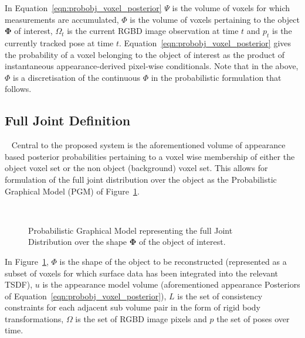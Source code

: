 In Equation~\ref{eqn:probobj_voxel_posterior} \( \Psi \) is the volume of 
voxels for which measurements are accumulated, \( \Phi \)  is the volume of voxels 
pertaining to the object \(\bm{\Phi}\) of interest, \(\Omega_{t}\) is the current 
RGBD image observation at time \(t\) and \(p_{t}\) is the currently tracked pose at 
time \(t\). Equation~\ref{eqn:probobj_voxel_posterior} gives the probability of 
a voxel belonging to the object of interest as the product of instantaneous appearance-derived 
pixel-wise conditionals. Note that in the above, \( \Phi \) is a discretisation of 
the continuous \( \Phi \) in the probabilistic formulation that follows.

\subsection{Full Joint Definition}
~\label{subsec:probobj_full_joint}
Central to the proposed system is the aforementioned volume of appearance based
posterior probabilities pertaining to a voxel wise membership of either the
object voxel set or the non object (background) voxel set. This allows for
formulation of the full joint distribution over the object as the Probabilistic
Graphical Model (PGM) of Figure~\ref{figure:probobj_pgm1}.
\begin{figure}[!htbp]
  \centering
  \caption[Probabilistic Object Reconstruction Formulation I]
  {Probabilistic Graphical Model representing the full Joint
    Distribution over the shape \(\bm{\Phi}\) of the object of interest.}
~\label{figure:probobj_pgm1}
\end{figure}

In Figure~\ref{figure:probobj_pgm1}, \( \Phi \) is the shape of the object to be 
reconstructed (represented as a subset of voxels for which surface data has been 
integrated into the relevant TSDF), \(u\) is the appearance model volume (aforementioned 
appearance Posteriors of Equation~\ref{eqn:probobj_voxel_posterior}), \(L\) is the set 
of consistency constraints for each adjacent sub volume pair in the form of rigid body 
transformations, \( \Omega \) is the set of RGBD image pixels and \(p\) the set of 
poses over time.

